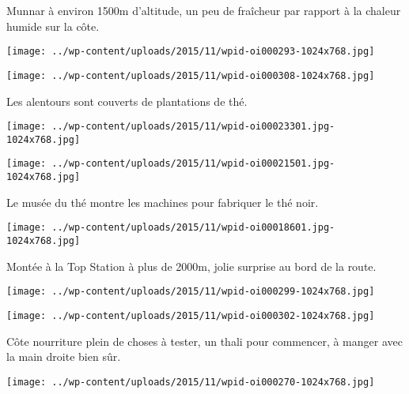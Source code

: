  Munnar à environ 1500m d'altitude, un peu de fraîcheur par rapport à la chaleur humide sur la côte. 
\begin{center} \texttt{[image: ../wp-content/uploads/2015/11/wpid-oi000293-1024x768.jpg]} \end{center}
\begin{center} \texttt{[image: ../wp-content/uploads/2015/11/wpid-oi000308-1024x768.jpg]} \end{center}

 Les alentours sont couverts de plantations de thé. 
\begin{center} \texttt{[image: ../wp-content/uploads/2015/11/wpid-oi00023301.jpg-1024x768.jpg]} \end{center}
\begin{center} \texttt{[image: ../wp-content/uploads/2015/11/wpid-oi00021501.jpg-1024x768.jpg]} \end{center}

 Le musée du thé montre les machines pour fabriquer le thé noir. 
\begin{center} \texttt{[image: ../wp-content/uploads/2015/11/wpid-oi00018601.jpg-1024x768.jpg]} \end{center}

\pagebreak
 Montée à la Top Station à plus de 2000m, jolie surprise au bord de la route. 
\begin{center} \texttt{[image: ../wp-content/uploads/2015/11/wpid-oi000299-1024x768.jpg]} \end{center}
\begin{center} \texttt{[image: ../wp-content/uploads/2015/11/wpid-oi000302-1024x768.jpg]} \end{center}

\pagebreak
 Côte nourriture plein de choses à tester, un thali pour commencer, à manger avec la main droite bien sûr. 
\begin{center} \texttt{[image: ../wp-content/uploads/2015/11/wpid-oi000270-1024x768.jpg]} \end{center}